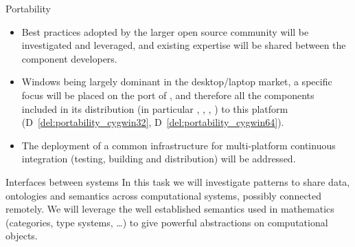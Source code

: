 \begin{Workpackage}{\thewpno}
\begin{task}{Portability}
    \begin{itemize}
    \item Best practices adopted by the larger open source community
      will be investigated and leveraged, and existing expertise will
      be shared between the component developers.
    \item Windows being largely dominant in the desktop/laptop market,
      a specific focus will be placed on the port of \Sage, and
      therefore all the components included in its distribution (in
      particular \Pari, \GAP, \Singular, \Linbox) to this platform
      (D~\ref{del:portability_cygwin32}, D~\ref{del:portability_cygwin64}).
    \item The deployment of a common infrastructure for multi-platform
      continuous integration (testing, building and distribution) will
      be addressed.
    \end{itemize}

  \end{task}

  \begin{task}{Interfaces between systems}
    In this task we will investigate patterns to share data,
    ontologies and semantics across computational systems, possibly
    connected remotely.  We will leverage the well established
    semantics used in mathematics (categories, type systems, \dots) to
    give powerful abstractions on computational objects.
    

\end{task}
\end{Workpackage}
